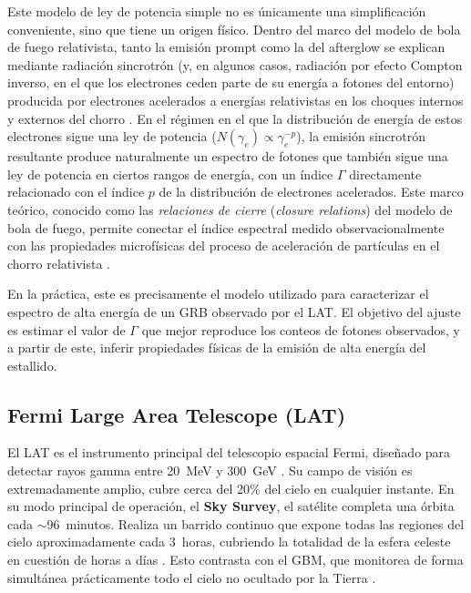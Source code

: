 Este modelo de ley de potencia simple no es únicamente una simplificación conveniente, sino que tiene un origen físico. Dentro del marco del modelo de bola de fuego relativista, tanto la emisión prompt como la del afterglow se explican mediante radiación sincrotrón (y, en algunos casos, radiación por efecto Compton inverso, en el que los electrones ceden parte de su energía a fotones del entorno) producida por electrones acelerados a energías relativistas en los choques internos y externos del chorro \cite{Meszaros2006, Sari1998}. En el régimen en el que la distribución de energía de estos electrones sigue una ley de potencia ($N(\gamma_e) \propto \gamma_e^{-p}$), la emisión sincrotrón resultante produce naturalmente un espectro de fotones que también sigue una ley de potencia en ciertos rangos de energía, con un índice $\Gamma$ directamente relacionado con el índice $p$ de la distribución de electrones acelerados. Este marco teórico, conocido como las \textit{relaciones de cierre} (\textit{closure relations}) del modelo de bola de fuego, permite conectar el índice espectral medido observacionalmente con las propiedades microfísicas del proceso de aceleración de partículas en el chorro relativista \cite{Sari1998, Zhang2004}.

En la práctica, este es precisamente el modelo utilizado para caracterizar el espectro de alta energía de un GRB observado por el LAT. El objetivo del ajuste es estimar el valor de $\Gamma$ que mejor reproduce los conteos de fotones observados, y a partir de este, inferir propiedades físicas de la emisión de alta energía del estallido.



\subsection{Fermi Large Area Telescope (LAT)}


El LAT es el instrumento principal del telescopio espacial Fermi, diseñado para detectar rayos gamma entre 20~MeV y 300~GeV \cite{Atwood2009}. Su campo de visión es extremadamente amplio, cubre cerca del 20$\%$ del cielo en cualquier instante. En su modo principal de operación, el \textbf{Sky Survey}, el satélite completa una órbita cada $\sim$96~minutos. Realiza un barrido continuo que expone todas las regiones del cielo aproximadamente cada 3~horas, cubriendo la totalidad de la esfera celeste en cuestión de horas a días \cite{Atwood2009}. Esto contrasta con el GBM, que monitorea de forma simultánea prácticamente todo el cielo no ocultado por la Tierra \cite{Meegan2009}.

